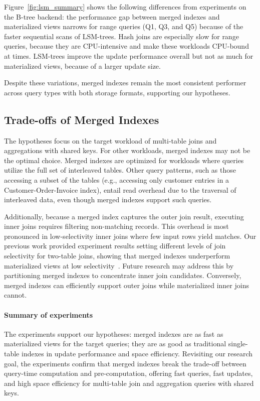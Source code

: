 \documentclass[sigconf, pdfa, nonacm]{acmart}
\newcommand\summary[1]{\paragraph{\textbf{#1}}}
\begin{document}
Figure~\ref{fig:lsm_summary} shows the following differences from experiments on the B-tree backend: the performance gap between merged indexes and materialized views narrows for range queries (Q1, Q3, and Q5) because of the faster sequential scans of LSM-trees.
Hash joins are especially slow for range queries, because they are CPU-intensive and make these workloads CPU-bound at times.
LSM-trees improve the update performance overall but not as much for materialized views, because of a larger update size.

Despite these variations, merged indexes remain the most consistent performer across query types with both storage formats, supporting our hypotheses.

\subsection{Trade-offs of Merged Indexes}\label{subsec:trade-offs}

The hypotheses focus on the target workload of multi-table joins and aggregations with shared keys. For other workloads, merged indexes may not be the optimal choice.
Merged indexes are optimized for workloads where queries utilize the full set of interleaved tables. Other query patterns, such as those accessing a subset of the tables (e.g., accessing only customer entries in a Customer-Order-Invoice index), entail read overhead due to the traversal of interleaved data, even though merged indexes support such queries.

Additionally, because a merged index captures the outer join result, executing inner joins requires filtering non-matching records. This overhead is most pronounced in low-selectivity inner joins where few input rows yield matches. 
Our previous work provided experiment results setting different levels of join selectivity for two-table joins, showing that merged indexes underperform materialized views at low selectivity~\cite{lyu2025indexing}.
Future research may address this by partitioning merged indexes to concentrate inner join candidates.
Conversely, merged indexes can efficiently support outer joins while materialized inner joins cannot.

\balance
\summary{Summary of experiments}\label{subsec:exp_summary}

The experiments support our hypotheses: merged indexes are as fast as materialized views for the target queries; they are as good as traditional single-table indexes in update performance and space efficiency. Revisiting our research goal, the experiments confirm that merged indexes break the trade-off between query-time computation and pre-computation, offering fast queries, fast updates, and high space efficiency for multi-table join and aggregation queries with shared keys.
\end{document}
